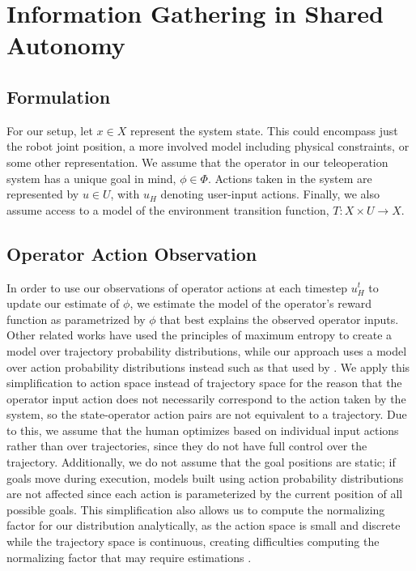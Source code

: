 \documentclass[conference]{IEEEtran}
\begin{document}
\section{Information Gathering in Shared Autonomy}
\subsection{Formulation}

For our setup, let $ x \in X $ represent the system state. This could encompass just the robot joint position, a more involved model including physical constraints, or some other representation. We assume that the operator in our teleoperation system has a unique goal in mind, $\phi \in \Phi$. Actions taken in the system are represented by $ u \in U $, with $u_H$ denoting user-input actions. Finally, we also assume access to a model of the environment transition function, $T: X \times U \rightarrow X$.

\subsection{Operator Action Observation}
In order to use our observations of operator actions at each timestep $u_H^t$ to update our estimate of $\phi$, we estimate the model of the operator's reward function as parametrized by $\phi$ that best explains the observed operator inputs. Other related works \cite{dragan2012formalizing, javdani2015shared} have used the principles of maximum entropy \cite{ziebart2008maximum} to create a model over trajectory probability distributions, while our approach uses a model over action probability distributions instead such as that used by \citet{ramachandran2007bayesian}. We apply this simplification to action space instead of trajectory space for the reason that the operator input action does not necessarily correspond to the action taken by the system, so the state-operator action pairs are not equivalent to a trajectory. Due to this, we assume that the human optimizes based on individual input actions rather than over trajectories, since they do not have full control over the trajectory. Additionally, we do not assume that the goal positions are static; if goals move during execution, models built using action probability distributions are not affected since each action is parameterized by the current position of all possible goals. This simplification also allows us to compute the normalizing factor for our distribution analytically, as the action space is small and discrete while the trajectory space is continuous, creating difficulties computing the normalizing factor that may require estimations \cite{javdani2015shared}.
\end{document}
